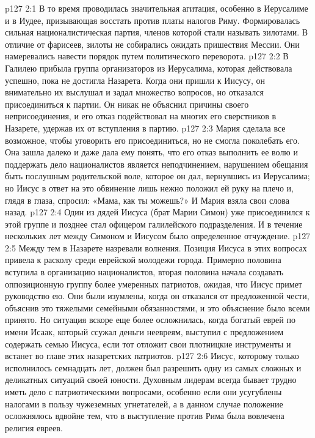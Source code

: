 \vs p127 2:1 В то время проводилась значительная агитация, особенно в Иерусалиме и в Иудее, призывающая восстать против платы налогов Риму. Формировалась сильная националистическая партия, членов которой стали называть зилотами. В отличие от фарисеев, зилоты не собирались ожидать пришествия Мессии. Они намеревались навести порядок путем политического переворота.
\vs p127 2:2 В Галилею прибыла группа организаторов из Иерусалима, которая действовала успешно, пока не достигла Назарета. Когда они пришли к Иисусу, он внимательно их выслушал и задал множество вопросов, но отказался присоединиться к партии. Он никак не объяснил причины своего неприсоединения, и его отказ подействовал на многих его сверстников в Назарете, удержав их от вступления в партию.
\vs p127 2:3 Мария сделала все возможное, чтобы уговорить его присоединиться, но не смогла поколебать его. Она зашла далеко и даже дала ему понять, что его отказ выполнить ее волю и поддержать дело националистов является неподчинением, нарушением обещания быть послушным родительской воле, которое он дал, вернувшись из Иерусалима; но Иисус в ответ на это обвинение лишь нежно положил ей руку на плечо и, глядя в глаза, спросил: «Мама, как ты можешь?» И Мария взяла свои слова назад.
\vs p127 2:4 Один из дядей Иисуса (брат Марии Симон) уже присоединился к этой группе и позднее стал офицером галилейского подразделения. И в течение нескольких лет между Симоном и Иисусом было определенное отчуждение.
\vs p127 2:5 Между тем в Назарете назревали волнения. Позиция Иисуса в этих вопросах привела к расколу среди еврейской молодежи города. Примерно половина вступила в организацию националистов, вторая половина начала создавать оппозиционную группу более умеренных патриотов, ожидая, что Иисус примет руководство ею. Они были изумлены, когда он отказался от предложенной чести, объяснив это тяжелыми семейными обязанностями, и это объяснение было всеми принято. Но ситуация вскоре еще более осложнилась, когда богатый еврей по имени Исаак, который ссужал деньги неевреям, выступил с предложением содержать семью Иисуса, если тот отложит свои плотницкие инструменты и встанет во главе этих назаретских патриотов.
\vs p127 2:6 Иисус, которому только исполнилось семнадцать лет, должен был разрешить одну из самых сложных и деликатных ситуаций своей юности. Духовным лидерам всегда бывает трудно иметь дело с патриотическими вопросами, особенно если они усугублены налогами в пользу чужеземных угнетателей, а в данном случае положение осложнялось вдвойне тем, что в выступление против Рима была вовлечена религия евреев.
